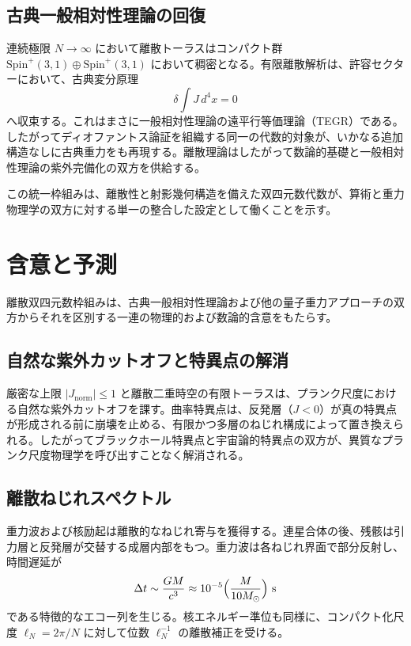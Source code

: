 \documentclass[a4paper]{article}
\theoremstyle{definition}
\theoremstyle{remark}
\newcommand{\Jnorm}{J_{\mathrm{norm}}}
\begin{document}
\subsection{古典一般相対性理論の回復}

連続極限 \( N \to \infty \) において離散トーラスはコンパクト群 \( \mathrm{Spin}^+(3,1) \oplus \mathrm{Spin}^+(3,1) \) において稠密となる。有限離散解析は、許容セクターにおいて、古典変分原理
\[
\delta \int J \, d^4x = 0
\]
へ収束する。これはまさに一般相対性理論の遠平行等価理論（TEGR）である。したがってディオファントス論証を組織する同一の代数的対象が、いかなる追加構造なしに古典重力をも再現する。離散理論はしたがって数論的基礎と一般相対性理論の紫外完備化の双方を供給する。

この統一枠組みは、離散性と射影幾何構造を備えた双四元数代数が、算術と重力物理学の双方に対する単一の整合した設定として働くことを示す。

\section{含意と予測}

離散双四元数枠組みは、古典一般相対性理論および他の量子重力アプローチの双方からそれを区別する一連の物理的および数論的含意をもたらす。

\subsection{自然な紫外カットオフと特異点の解消}

厳密な上限 \( |\Jnorm| \leq 1 \) と離散二重時空の有限トーラスは、プランク尺度における自然な紫外カットオフを課す。曲率特異点は、反発層（\( J < 0 \)）が真の特異点が形成される前に崩壊を止める、有限かつ多層のねじれ構成によって置き換えられる。したがってブラックホール特異点と宇宙論的特異点の双方が、異質なプランク尺度物理学を呼び出すことなく解消される。

\subsection{離散ねじれスペクトル}

重力波および核励起は離散的なねじれ寄与を獲得する。連星合体の後、残骸は引力層と反発層が交替する成層内部をもつ。重力波は各ねじれ界面で部分反射し、時間遅延が
\[
\Delta t \sim \frac{GM}{c^3} \approx 10^{-5} \Bigl( \frac{M}{10 M_\odot} \Bigr) \text{ s}
\]
である特徴的なエコー列を生じる。核エネルギー準位も同様に、コンパクト化尺度 \(\ell_N = 2\pi / N\) に対して位数 \( \ell_N^{-1} \) の離散補正を受ける。
\end{document}
